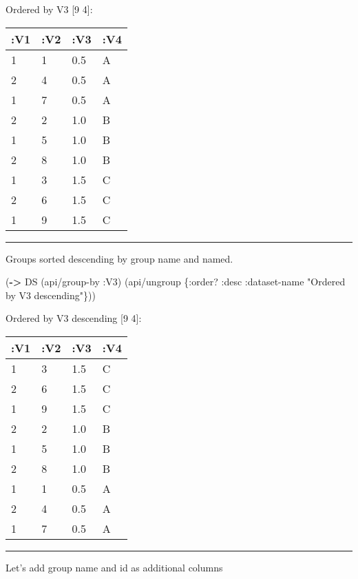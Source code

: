 \documentclass[]{article}
\newenvironment{Shaded}{\begin{snugshade}}{\end{snugshade}}
\newcommand{\AttributeTok}[1]{\textcolor[rgb]{0.77,0.63,0.00}{#1}}
\newcommand{\DecValTok}[1]{\textcolor[rgb]{0.00,0.00,0.81}{#1}}
\newcommand{\KeywordTok}[1]{\textcolor[rgb]{0.13,0.29,0.53}{\textbf{#1}}}
\newcommand{\NormalTok}[1]{#1}
\newcommand{\StringTok}[1]{\textcolor[rgb]{0.31,0.60,0.02}{#1}}
\newcommand{\VariableTok}[1]{\textcolor[rgb]{0.00,0.00,0.00}{#1}}
\begin{document}
Ordered by V3 {[}9 4{]}:

\begin{longtable}[]{@{}llll@{}}
\toprule
:V1 & :V2 & :V3 & :V4\tabularnewline
\midrule
\endhead
1 & 1 & 0.5 & A\tabularnewline
2 & 4 & 0.5 & A\tabularnewline
1 & 7 & 0.5 & A\tabularnewline
2 & 2 & 1.0 & B\tabularnewline
1 & 5 & 1.0 & B\tabularnewline
2 & 8 & 1.0 & B\tabularnewline
1 & 3 & 1.5 & C\tabularnewline
2 & 6 & 1.5 & C\tabularnewline
1 & 9 & 1.5 & C\tabularnewline
\bottomrule
\end{longtable}

\begin{center}\rule{0.5\linewidth}{0.5pt}\end{center}

Groups sorted descending by group name and named.

\begin{Shaded}
\begin{Highlighting}[]
\NormalTok{(}\KeywordTok{->}\NormalTok{ DS}
\NormalTok{    (api/group-by }\AttributeTok{:V3}\NormalTok{)}
\NormalTok{    (api/ungroup \{}\AttributeTok{:order}\NormalTok{? }\AttributeTok{:desc}
                  \AttributeTok{:dataset-name} \StringTok{"Ordered by V3 descending"}\NormalTok{\}))}
\end{Highlighting}
\end{Shaded}

Ordered by V3 descending {[}9 4{]}:

\begin{longtable}[]{@{}llll@{}}
\toprule
:V1 & :V2 & :V3 & :V4\tabularnewline
\midrule
\endhead
1 & 3 & 1.5 & C\tabularnewline
2 & 6 & 1.5 & C\tabularnewline
1 & 9 & 1.5 & C\tabularnewline
2 & 2 & 1.0 & B\tabularnewline
1 & 5 & 1.0 & B\tabularnewline
2 & 8 & 1.0 & B\tabularnewline
1 & 1 & 0.5 & A\tabularnewline
2 & 4 & 0.5 & A\tabularnewline
1 & 7 & 0.5 & A\tabularnewline
\bottomrule
\end{longtable}

\begin{center}\rule{0.5\linewidth}{0.5pt}\end{center}

Let's add group name and id as additional columns

\begin{Shaded}
\end{Shaded}
\end{document}
